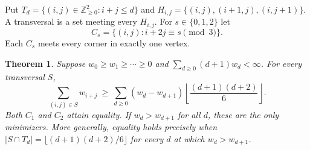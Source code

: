 \documentclass[11pt]{article}
\newtheorem{theorem}{Theorem}[section]
\begin{document}
Put $T_d=\{(i,j)\in\mathbb Z_{\ge0}^2:i+j\le d\}$ and
$H_{i,j}=\{(i,j),(i+1,j),(i,j+1)\}$. A transversal is a set meeting
every $H_{i,j}$. For $s\in\{0,1,2\}$ let
\[
 C_s=\{(i,j):i+2j\equiv s\pmod3\}.
\]
Each $C_s$ meets every corner in exactly one vertex.

\begin{theorem}\label{thm:diagonal-weight}
Suppose $w_0\ge w_1\ge\cdots\ge0$ and
$\sum_{d\ge0}(d+1)w_d<\infty$. For every transversal $S$,
\[
 \sum_{(i,j)\in S}w_{i+j}
 \ \ge\
 \sum_{d\ge0}(w_d-w_{d+1})
       \left\lfloor\frac{(d+1)(d+2)}6\right\rfloor.
\]
Both $C_1$ and $C_2$ attain equality. If $w_d>w_{d+1}$ for all $d$,
these are the only minimizers. More generally, equality holds precisely
when $|S\cap T_d|=\lfloor(d+1)(d+2)/6\rfloor$ for every $d$ at which
$w_d>w_{d+1}$.
\end{theorem}
\end{document}
